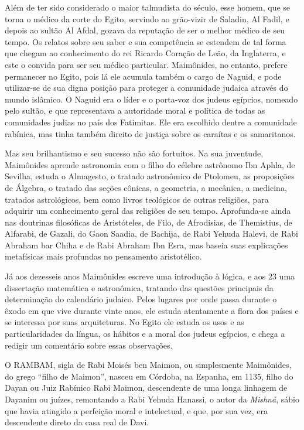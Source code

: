Além de ter sido considerado o maior talmudista do século, esse homem,
que se torna o médico da corte do Egito, servindo ao grão-vizir de
Saladin, Al Fadil, e depois ao sultão Al Afdal, gozava da reputação de
ser o melhor médico de seu tempo. Os relatos sobre seu saber e sua
competência se estendem de tal forma que chegam ao conhecimento do rei
Ricardo Coração de Leão, da Inglaterra, e este o convida para ser seu
médico particular. Maimônides, no entanto, prefere permanecer no Egito,
pois lá ele acumula também o cargo de Naguid, e pode utilizar-se de sua
digna posição para proteger a comunidade judaica através do mundo
islâmico. O Naguid era o líder e o porta-voz dos judeus egípcios,
nomeado pelo sultão, e que representava a autoridade moral e política
de todas as comunidades judias no país dos Fatimitas. Ele era escolhido
dentre a comunidade rabínica, mas tinha também direito de justiça sobre
os caraítas e os samaritanos.

Mas seu brilhantismo e seu sucesso não são fortuitos. Na sua juventude,
Maimônides aprende astronomia com o filho do célebre astrônomo Ibn
Aphla, de Sevilha, estuda o Almagesto, o tratado astronômico de
Ptolomeu, as proposições de Álgebra, o tratado das seções cônicas, a
geometria, a mecânica, a medicina, tratados astrológicos, bem como
livros teológicos de outras religiões, para adquirir um conhecimento
geral das religiões de seu tempo. Aprofunda-se ainda nas doutrinas
filosóficas de Aristóteles, de Filo, de Afrodisias, de Themistius, de
Alfarabi, de Gazali, do Gaon Saadia, de Bachija, de Rabi Yehuda Halevi,
de Rabi Abraham bar Chiha e de Rabi Abraham Ibn Esra, mas baseia suas
explicações metafísicas mais profundas no pensamento aristotélico.

Já aos dezesseis anos Maimônides escreve uma introdução à lógica, e aos
23 uma dissertação matemática e astronômica, tratando das questões
principais da determinação do calendário judaico. Pelos lugares por onde
passa durante o êxodo em que vive durante vinte anos, ele estuda
atentamente a flora dos países e se interessa por suas arquiteturas. No
Egito ele estuda os usos e as particularidades da língua, os hábitos e
a moral dos judeus egípcios, e chega a redigir um comentário sobre essas
observações.

O RAMBAM, sigla de Rabi Moisés ben Maimon, ou simplesmente Maimônides,
do grego ``filho de Maimon'', nasceu em Córdoba, na Espanha, em 1135,
filho do Dayan ou Juiz Rabínico Rabi Maimon, descendente de uma longa linhagem de Dayanim ou juízes, remontando a Rabi Yehuda Hanassi, o
autor da \emph{Mishná}, sábio que havia atingido a perfeição moral e
intelectual, e que, por sua vez, era descendente direto da casa real de
Davi.

